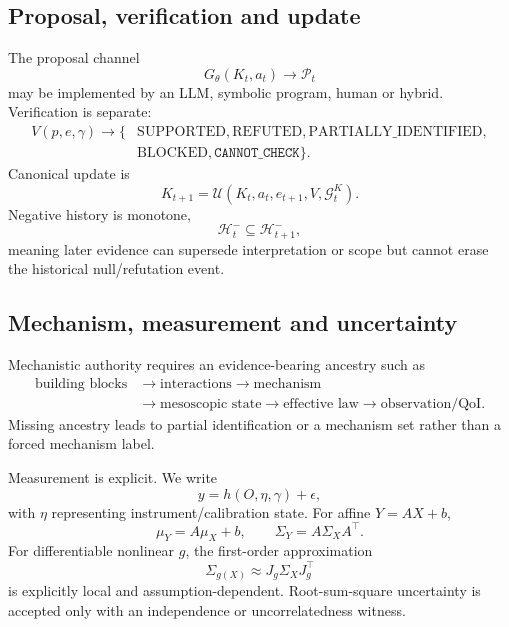 \documentclass[11pt]{article}
\newcommand{\CannotCheck}{\texttt{CANNOT\_CHECK}}
\begin{document}
\subsection{Proposal, verification and update}
The proposal channel
\begin{equation}G_\theta(K_t,a_t)\rightarrow\mathcal P_t\end{equation}
may be implemented by an LLM, symbolic program, human or hybrid. Verification is separate:
\begin{equation}
\begin{aligned}
V(p,e,\gamma)\rightarrow\{&\mathrm{SUPPORTED},\mathrm{REFUTED},\mathrm{PARTIALLY\_IDENTIFIED},\\
&\mathrm{BLOCKED},\CannotCheck\}.
\end{aligned}
\end{equation}
Canonical update is
\begin{equation}K_{t+1}=\mathcal U(K_t,a_t,e_{t+1},V,\mathcal G_t^K).\end{equation}
Negative history is monotone,
\begin{equation}\mathcal H_t^{-}\subseteq\mathcal H_{t+1}^{-},\end{equation}
meaning later evidence can supersede interpretation or scope but cannot erase the historical null/refutation event.

\subsection{Mechanism, measurement and uncertainty}
Mechanistic authority requires an evidence-bearing ancestry such as
\begin{equation}
\begin{aligned}
\text{building blocks}&\to\text{interactions}\to\text{mechanism}\\
&\to\text{mesoscopic state}\to\text{effective law}\to\text{observation/QoI}.
\end{aligned}
\end{equation}
Missing ancestry leads to partial identification or a mechanism set rather than a forced mechanism label.

Measurement is explicit. We write
\begin{equation}y=h(O,\eta,\gamma)+\epsilon,\end{equation}
with $\eta$ representing instrument/calibration state. For affine $Y=AX+b$,
\begin{equation}\mu_Y=A\mu_X+b,\qquad \Sigma_Y=A\Sigma_XA^\top.\end{equation}
For differentiable nonlinear $g$, the first-order approximation
\begin{equation}\Sigma_{g(X)}\approx J_g\Sigma_XJ_g^\top\end{equation}
is explicitly local and assumption-dependent. Root-sum-square uncertainty is accepted only with an independence or uncorrelatedness witness.
\end{document}
